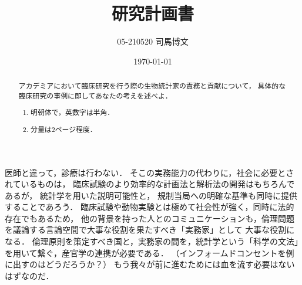 \documentclass[uplatex, dvipdfmx]{jsarticle}
\title{研究計画書}
\author{05-210520 司馬博文}
\date{\today}
\begin{document}
\begin{abstract}
    アカデミアにおいて臨床研究を行う際の生物統計家の責務と貢献について，
    具体的な臨床研究の事例に即してあなたの考えを述べよ．
    \begin{enumerate}
        \item 明朝体で，英数字は半角．
        \item 分量は2ページ程度．
    \end{enumerate}
\end{abstract}

医師と違って，診療は行わない．
そこの実務能力の代わりに，社会に必要とされているものは，
臨床試験のより効率的な計画法と解析法の開発はもちろんであるが，
統計学を用いた説明可能性と，
規制当局への明確な基準も同時に提供することであろう．
臨床試験や動物実験とは極めて社会性が強く，同時に法的存在でもあるため，
他の背景を持った人とのコミュニケーションも，倫理問題を議論する言論空間で大事な役割を果たすべき「実務家」として
大事な役割になる．
倫理原則を策定すべき国と，実務家の間を，統計学という「科学の文法」を用いて繋ぐ，産官学の連携が必要である．
（インフォームドコンセントを例に出すのはどうだろうか？）
もう我々が前に進むためには血を流す必要はないはずなのだ．
\end{document}
